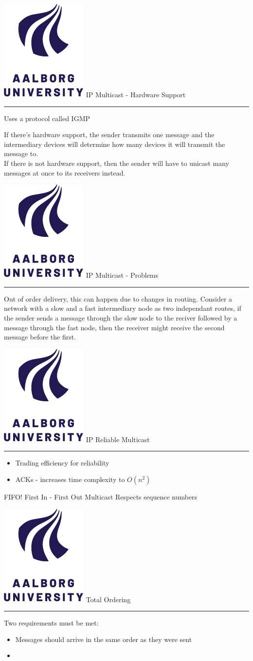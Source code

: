 \documentclass[aspectratio=1610,17pt,utf8]{beamer}
\newcommand{\regularframe}[1]{\color{black}\includegraphics[width=.05\textwidth]{figures/aau.png} #1\\\hrule}
\begin{document}
\begin{frame}{\regularframe{IP Multicast - Hardware Support}}
    Uses a protocol called IGMP

    If there's hardware support, the sender transmits one message and the intermediary devices will determine how many devices it will transmit the message to.\\
    If there is not hardware support, then the sender will have to unicast many messages at once to its receivers instead.
\end{frame}

\begin{frame}{\regularframe{IP Multicast - Problems}}
    Out of order delivery, this can happen due to changes in routing. Consider a network with a slow and a fast intermediary node as two independant routes, if the sender sends a message through the slow node to the reciver followed by a message through the fast node, then the receiver might receive the second message before the first.
\end{frame}

\begin{frame}{\regularframe{IP Reliable Multicast}}
    \begin{itemize}
        \item Trading efficiency for reliability
        \item ACKs - increases time complexity to $O(n^2)$
    \end{itemize}
\end{frame}

\begin{frame}{FIFO! First In - First Out Multicast}
    Respects sequence numbers

\end{frame}

\begin{frame}{\regularframe{Total Ordering}}
    Two requirements must be met:
    \begin{itemize}
        \item Messages should arrive in the same order as they were sent
        \item 
    \end{itemize}
\end{frame}
\end{document}
